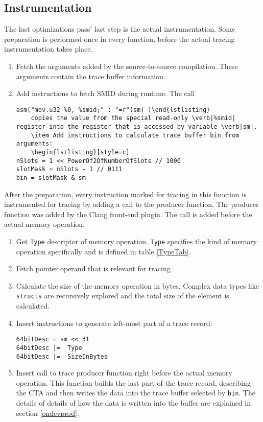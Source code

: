 \subsection{Instrumentation}\label{instru}
The last optimizations pass' last step is the actual instrumentation. Some preparation is performed once in every function, before the actual tracing instrumentation takes place.
\begin{enumerate}
	\item Fetch the arguments added by the source-to-source compilation. These arguments contain the trace buffer information.
	\item Add instructions to fetch SMID during runtime. The call 
		\begin{lstlisting}[style=c]
asm("mov.u32 %0, %smid;" : "=r"(sm) )\end{lstlisting}
	copies the value from the special read-only \verb|%smid| register into the register that is accessed by variable \verb|sm|.
	\item Add instructions to calculate trace buffer bin from arguments:
	\begin{lstlisting}[style=c]
nSlots = 1 << PowerOf2OfNumberOfSlots // 1000
slotMask = nSlots - 1 // 0111
bin = slotMask & sm\end{lstlisting}
\end{enumerate}
After the preparation, every instruction marked for tracing in this function is instrumented for tracing by adding a call to the producer function. The producer function was added by the Clang front-end plugin. The call is added before the actual memory operation.
\begin{enumerate}
	\item Get  \verb|Type| descriptor of memory operation. 	\verb|Type| specifies the kind of memory operation specifically and is defined in table \ref{TypeTab}.
	\item Fetch pointer operand that is relevant for tracing
	\item Calculate the size of the memory operation in bytes. Complex data types like \verb|structs| are recursively explored and the total size of the element is calculated.
	\item Insert instructions to generate left-most part of a trace record:
		\begin{lstlisting}[style=c]
64bitDesc = sm << 31
64bitDesc |=  Type
64bitDesc |=  SizeInBytes\end{lstlisting}

	\item Insert call to trace producer function right before the actual memory operation. This function builds the
	last part of the trace record, describing the CTA and then writes the data into the trace buffer selected by \verb|bin|. The details of details of how the data is written into the buffer are explained in section \ref{ondevprod}.
\end{enumerate}
